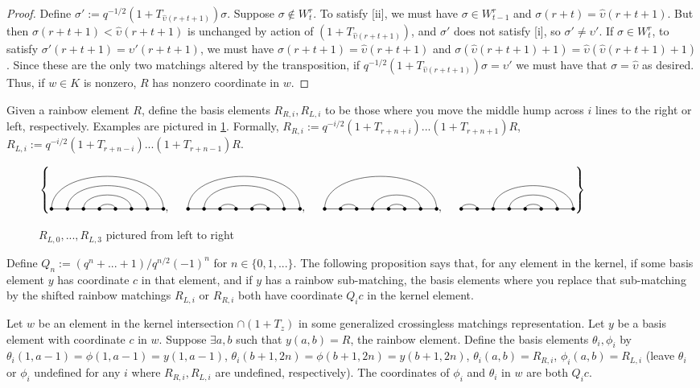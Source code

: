 \documentclass{amsart}
\begin{document}
\begin{proof}
	Define $\sigma':=q^{-1/2}(1+T_{\widehat{\upsilon}(r+t+1)})\sigma$. Suppose $\sigma\not\in W^r_t$. To satisfy [ii], we must have $\sigma\in W^r_{t-1}$ and $\sigma(r+t)=\widehat{\upsilon}(r+t+1)$. But then $\sigma(r+t+1)<\widehat{\upsilon}(r+t+1)$ is unchanged by action of $(1+T_{\widehat{\upsilon}(r+t+1)})$, and $\sigma'$ does not satisfy [i], so $\sigma'\not=\upsilon'$. If $\sigma\in W^r_t$, to satisfy $\sigma'(r+t+1)=\upsilon'(r+t+1)$, we must have $\sigma(r+t+1)=\widehat{\upsilon}(r+t+1)$ and $\sigma(\widehat{\upsilon}(r+t+1)+1)=\widehat{\upsilon}(\widehat{\upsilon}(r+t+1)+1)$. Since these are the only two matchings altered by the transposition, if $q^{-1/2}(1+T_{\widehat{\upsilon}(r+t+1)})\sigma=\upsilon'$ we must have that $\sigma=\widehat{\upsilon}$ as desired. Thus, if $w\in K$ is nonzero, $R$ has nonzero coordinate in $w$.
\end{proof}

Given a rainbow element $R$, define the basis elements $R_{R,i},R_{L,i}$ to be those where you move the middle hump across $i$ lines to the right or left, respectively. Examples are pictured in \ref{shifted rainbow}. Formally, $R_{R,i}:=q^{-i/2}(1+T_{r+n+i})...(1+T_{r+n+1})R$, $R_{L,i}:=q^{-i/2}(1+T_{r+n-i})...(1+T_{r+n-1})R$.

\begin{figure}
	\def\cbasisspacing{5mm}
	$\cbr{
		\begin{gathered}
		\Matching{8}{1/8, 2/7, 3/6, 4/5}, \hspace{\cbasisspacing}
		\Matching{8}{1/8, 2/7, 3/4, 5/6}, \hspace{\cbasisspacing}
		\Matching{8}{1/8, 2/3, 4/7, 5/6}, \hspace{\cbasisspacing}
		\Matching{8}{1/2,3/8,4/7,5/6}
		\end{gathered}}$
	\caption{$R_{L,0},...,R_{L,3}$ pictured from left to right}
	\label{shifted rainbow}
\end{figure}

Define $Q_n:=(q^n+...+1)/q^{n/2}(-1)^n$ for $n\in \{0,1,...\}$. The following proposition says that, for any element in the kernel, if some basis element $y$ has coordinate $c$ in that element, and if $y$ has a rainbow sub-matching, the basis elements where you replace that sub-matching by the shifted rainbow matchings $R_{L,i}$ or $R_{R,i}$ both have coordinate $Q_ic$ in the kernel element.

\begin{proposition}
	Let $w$ be an element in the kernel intersection $\cap (1+T_z)$ in some generalized crossingless matchings representation. Let $y$ be a basis element with coordinate $c$ in $w$. Suppose $\exists a,b$ such that $y(a,b)=R$, the rainbow element. Define the basis elements $\theta_i,\phi_i$ by $\theta_i(1,a-1)=\phi(1,a-1)=y(1,a-1)$, $\theta_i(b+1,2n)=\phi(b+1,2n)=y(b+1,2n)$, $\theta_i(a,b)=R_{R,i}$, $\phi_i(a,b)=R_{L,i}$ (leave $\theta_i$ or $\phi_i$ undefined for any $i$ where $R_{R,i},R_{L,i}$ are undefined, respectively). The coordinates of $\phi_i$ and $\theta_i$ in $w$ are both $Q_ic$.
	
	\label{shifted rainbow coeffs}
\end{proposition}
\end{document}
